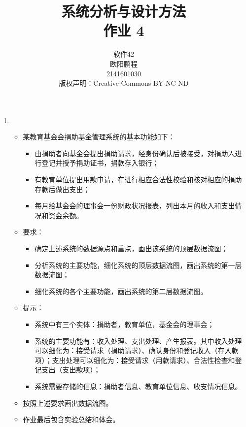 \documentclass[UTF8]{ctexart}
\title{系统分析与设计方法 \\ 作业 4}
\author{软件42 \\ 欧阳鹏程 \\ 2141601030 \\ 版权声明：Creative Commons BY-NC-ND}
\begin{document}
\maketitle

\begin{enumerate}
	\item 
	\begin{itemize}
		\item 某教育基金会捐助基金管理系统的基本功能如下：
		\begin{itemize}
			\item 由捐助者向基金会提出捐助请求，经身份确认后被接受，对捐助人进行登记并授予捐助证书，捐款存入银行；
			\item 有教育单位提出用款申请，在进行相应合法性校验和核对相应的捐助存款后做出支出；
			\item 每月给基金会的理事会一份财政状况报表，列出本月的收入和支出情况和资金余额。
		\end{itemize}
		\item 要求：
		\begin{itemize}
			\item 确定上述系统的数据源点和重点，画出该系统的顶层数据流图；
			\item 分析系统的主要功能，细化系统的顶层数据流图，画出系统的第一层数据流图；
			\item 细化系统的各个主要功能，画出系统的第二层数据流图。
		\end{itemize}
		\item 提示：
		\begin{itemize}
			\item 系统中有三个实体：捐助者，教育单位，基金会的理事会；
			\item 系统的主要功能有：收入处理、支出处理、产生报表。其中收入处理可以细化为：接受请求（捐助请求）、确认身份和登记收入（存入款项）；支出处理可以细化为：接受请求（用款请求）、合法性检查和登记支出（支出款项）；
			\item 系统需要存储的信息：捐助者信息、教育单位信息、收支情况信息。
		\end{itemize}
		\item 按照上述要求画出数据流图。
		\item 作业最后包含实验总结和体会。
	\end{itemize}
		
\end{enumerate}
\end{document}
